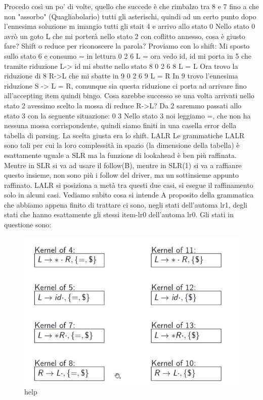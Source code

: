 \documentclass[class=book, crop=false, oneside, 12pt]{standalone}
\begin{document}
Procedo così un po' di volte, quello che succede è che rimbalzo tra 8 e 7 fino a che non "assorbo"
(Quagliabolario) tutti gli asterischi, quindi ad un certo punto dopo l'ennesima soluzione m imangio
tutti gli stait 4 e arrivo allo stato 0
Nello stato 0 avrò un goto L che mi porterà nello stato 2 con coflitto annesso, cosa è giusto fare?
Shift o reduce per riconoscere la parola?
Proviamo con lo shift:
Mi sposto sullo stato 6 e consumo = in lettura
0 2 6
L =
ora vedo id, id mi porta in 5 che tramite riduzione L-> id mi sbatte nello stato 8
0 2 6 8
L = L
Ora trovo la riduzione di 8 R->L che mi sbatte in 9
0 2 6 9
L = R
In 9 trovo l'ennesima riduzione S -> L = R, comunque sia questa riduzione ci porta ad arrivare fino
all'accepting item quindi bingo.
Cosa sarebbe successo se una volta arrivati nello stato 2 avessimo scelto la mossa di reduce R->L?
Da 2 saremmo passati allo stato 3 con la seguente situazione:
0 3
Nello stato 3 noi leggiamo =, che non ha nessuna mossa corrispondente, quindi siamo finiti in una
casella error della tabella di parsing.
La scelta giusta era lo shift.
LALR
Le grammatiche LALR sono tali per cui la loro complessità in spazio (la dimensione della tabella) è
esattamente uguale a SLR ma la funzione di lookahead è ben più raffinata.
Mentre in SLR si va ad usare il follow(B), mentre in SLR(1) si va a raffianre questo insieme, non sono
più i follow del driver, ma un sottinsieme appunto raffinato.
LALR si posiziona a metà tra questi due casi, si esegue il raffinamento solo in alcuni casi.
Vediamo subito cosa si intende
A proposito della grammatica che abbiamo appena finito di trattare ci sono, negli stati dell'automa
lr1, degli stati che hanno esattamente gli stessi item-lr0 dell'automa lr0.
Gli stati in questione sono:
\begin{figure}[H]
    \centering
    \includegraphics[width=.8\textwidth]{send_help_7.png}
    \caption{help}
\end{figure}
\end{document}
